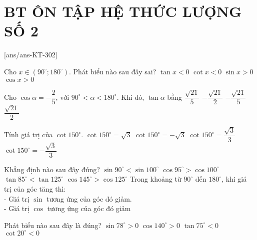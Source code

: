 \section*{BT ÔN TẬP HỆ THỨC LƯỢNG SỐ 2}
\setcounter{ex}{0}\setcounter{ex}{0}
[ans/ans-KT-302]
\begin{ex} 
	Cho $x\in(90^\circ;180^\circ)$. Phát biểu nào sau đây sai?
	\choice
	{$\tan x<0$}
	{$\cot x<0$}
	{$\sin x>0$}
	{\True $\cos x>0$}
\end{ex}
\begin{ex}
	Cho $\cos\alpha=-\dfrac{2}{5}$, với $90^\circ<\alpha<180^\circ$. Khi đó, $\tan\alpha$ bằng
	\choice
	{$\dfrac{\sqrt{21}}{5}$}
	{\True $-\dfrac{\sqrt{21}}{2}$}
	{$-\dfrac{\sqrt{21}}{5}$}
	{$\dfrac{\sqrt{21}}{2}$}
\end{ex}
\begin{ex}
	Tính giá trị của $\cot150^\circ$.
	\choice
	{$\cot150^\circ=\sqrt{3}$}
	{\True $\cot150^\circ=-\sqrt{3}$}
	{$\cot150^\circ=\dfrac{\sqrt{3}}{3}$}
	{$\cot150^\circ=-\dfrac{\sqrt{3}}{3}$}
\end{ex}
\begin{ex}
	Khẳng định nào sau đây đúng?
	\choice
	{$\sin 90^\circ<\sin 100^\circ$}
	{\True $\cos 95^\circ>\cos 100^\circ$}
	{$\tan 85^\circ<\tan 125^\circ$}
	{$\cos 145^\circ>\cos 125^\circ$}
	\loigiai
	{Trong khoảng từ $90^\circ$ đến $180^\circ$, khi giá trị của góc tăng thì:\\
		- Giá trị $\sin$ tương ứng của góc đó giảm.\\
		- Giá trị $\cos$ tương ứng của góc đó giảm}
\end{ex}
\begin{ex}
	Phát biểu nào sau đây là đúng?
	\choice
	{\True $\sin78^\circ>0$}
	{$\cos 140^\circ>0$}
	{$\tan75^\circ<0$}
	{ $\cot20^\circ<0$}
\end{ex}
